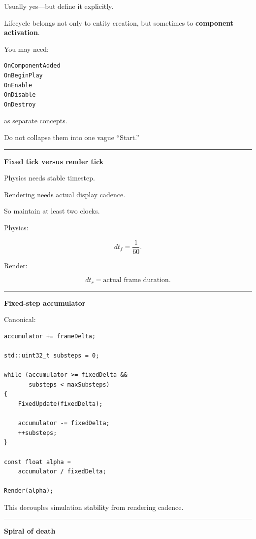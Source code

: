 Usually yes---but define it explicitly.

Lifecycle belongs not only to entity creation, but sometimes to \textbf{component activation}.

You may need:

\begin{verbatim}
OnComponentAdded
OnBeginPlay
OnEnable
OnDisable
OnDestroy
\end{verbatim}

as separate concepts.

Do not collapse them into one vague ``Start.''

\begin{center}\rule{0.5\linewidth}{0.5pt}\end{center}

\textbf{Fixed tick versus render tick}

Physics needs stable timestep.

Rendering needs actual display cadence.

So maintain at least two clocks.

Physics:

\[
dt_f=\frac{1}{60}.
\]

Render:

\[
dt_r=
\text{actual frame duration}.
\]

\begin{center}\rule{0.5\linewidth}{0.5pt}\end{center}

\textbf{Fixed-step accumulator}

Canonical:

\begin{verbatim}
accumulator += frameDelta;

std::uint32_t substeps = 0;

while (accumulator >= fixedDelta &&
       substeps < maxSubsteps)
{
    FixedUpdate(fixedDelta);

    accumulator -= fixedDelta;
    ++substeps;
}

const float alpha =
    accumulator / fixedDelta;

Render(alpha);
\end{verbatim}

This decouples simulation stability from rendering cadence.

\begin{center}\rule{0.5\linewidth}{0.5pt}\end{center}

\textbf{Spiral of death}

